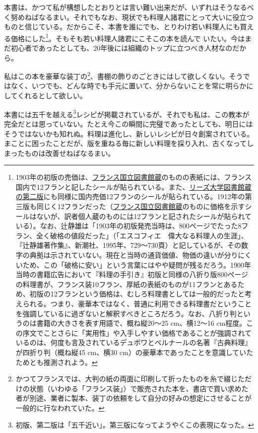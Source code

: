 \begin{Main}
本書は、かつて私が構想したとおりとは言い難い出来だが、いずれはそうなるべく努めねばなるまい。それでもなお、現状でも料理人諸君にとって大いに役立つものと信じている。だからこそ、本書を誰にでも、とりわけ若い料理人にも買える価格にした\footnote{1903年の初版の売価は、\href{http://gallica.bnf.fr/ark:/12148/bpt6k65768837}{フランス国立図書館蔵}のものの表紙には、フランス国内で12フランと記したシールが貼られている。また、\href{https://archive.org/details/b21525912}{リーズ大学図書館蔵の第二版}にも同様に国内売価12フランのシールが貼られている。1912年の第三版も同じく12フランだった（\href{http://gallica.bnf.fr/ark:/12148/bpt6k96923116}{フランス国立図書館蔵}のものに価格を示すシールはないが、訳者個人蔵のものには12フランと記されたシールが貼られている）。なお、辻静雄は「1903年の初版発売当時は、800ページでたった8フラン、全く破格の値段だった」（「エスコフィエ　偉大なる料理人の生涯」、『辻静雄著作集』、新潮社、1995年、729〜730頁）と記しているが、その数字の典拠は示されていない。現在と当時の通貨価値、物価の違いが分りにくいため、この「破格に安い」という言葉にはやや疑問が残るだろう。1900年当時の書籍広告において『料理の手引き』初版と同様の八折り版800ページの料理書が、フランス装10フラン、厚紙の表紙のものが11フランとあるため、初版の12フランという価格は、むしろ料理書としては一般的だったと考えられる。つまり、豪華本ではなく、普通に利用できる料理書だということを強調しているに過ぎないと解釈すべきところだろう。なお、八折り判というのは書籍の大きさを表す用語で、概ね縦20〜25
  cm、横12〜16
  cm程度。この序文でことさらに「実用性」や入手しやすい価格であることが強調されているのは、何度も言及されているデュボワとベルナールの名著『古典料理』が四折り判（概ね縦45
  cm、横30 cm）の豪華本であったことを意識していたためとも推測されよう。}。そもそも若い料理人諸君にこそこの本を読んで
いたい。今はまだ初心者であったとしても、20年後には組織のトップに立つべき人材なのだから。

私はこの本を豪華な装丁の\footnote{かつてフランスでは、大判の紙の両面に印刷して折ったものを糸で綴じただけの状態（いわゆる「フランス装」）で販売された本を、書店で買い求めた者が別途、業者に製本、装丁の依頼をして自分の好みの想定にさせることが一般的に行なわれていた。}、書棚の飾りのごときにはして欲しくない。そうではなく、いつでも、どんな時でも手元に置いて、分からないことを常に明らかにしてくれるとして欲しい。

本書には五千を越える\footnote{初版、第二版は「五千近い」。第三版になってようやくこの表現になった。}レシピが掲載されているが、それでも私は、この教本が完全だとは思っていない。たとえ今この瞬間に完璧であったとしても、明日にはそうではないかも知れぬ。料理は進化し、新しいレシピが日々創案されている。まことに困ったことだが、版を重ねる毎に新しい料理を採り入れ、古くなってしまったものは改善せねばなるまい。


\end{Main}

